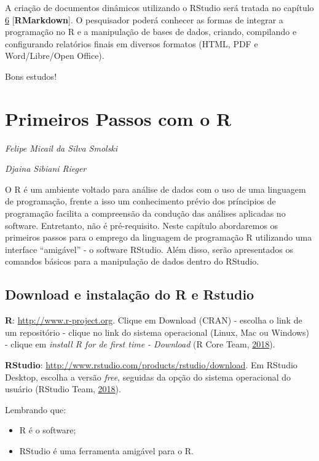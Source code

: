 \documentclass[12pt,brazil,oneside]{book}
\providecommand{\tightlist}{%
  \setlength{\itemsep}{0pt}\setlength{\parskip}{0pt}}
\begin{document}
A criação de documentos dinâmicos utilizando o RStudio será tratada no capítulo \protect\hyperlink{rmark}{6} {[}\textbf{RMarkdown}{]}. O pesquisador poderá conhecer as formas de integrar a programação no R e a manipulação de bases de dados, criando, compilando e configurando relatórios finais em diversos formatos (HTML, PDF e Word/Libre/Open Office).

Bons estudos!

\hypertarget{intro}{%
\chapter{Primeiros Passos com o R}\label{intro}}

\emph{Felipe Micail da Silva Smolski}

\emph{Djaina Sibiani Rieger}

\begin{flushright}
\emph{}
\end{flushright}

O R é um ambiente voltado para análise de dados com o uso de uma linguagem de programação, frente a isso um conhecimento prévio dos príncipios de programação facilita a compreensão da condução das análises aplicadas no software. Entretanto, não é pré-requisito. Neste capítulo abordaremos os primeiros passos para o emprego da linguagem de programação R utilizando uma interface ``amigável'' - o software RStudio. Além disso, serão apresentados os comandos básicos para a manipulação de dados dentro do RStudio.

\hypertarget{download-e-instalacao-do-r-e-rstudio}{%
\section{Download e instalação do R e Rstudio}\label{download-e-instalacao-do-r-e-rstudio}}

\textbf{R}: \url{http://www.r-project.org}. Clique em Download (CRAN) - escolha o link de um repositório - clique no link do sistema operacional (Linux, Mac ou Windows) - clique em \emph{install R for de first time - Download} (R Core Team, \protect\hyperlink{ref-rcore}{2018}).

\textbf{RStudio}: \url{http://www.rstudio.com/products/rstudio/download}. Em RStudio Desktop, escolha a versão \emph{free}, seguidas da opção do sistema operacional do usuário (RStudio Team, \protect\hyperlink{ref-teamrstudio}{2018}).

Lembrando que:

\begin{itemize}
\tightlist
\item
  R é o software;
\item
  RStudio é uma ferramenta amigável para o R.
\end{itemize}
\end{document}
